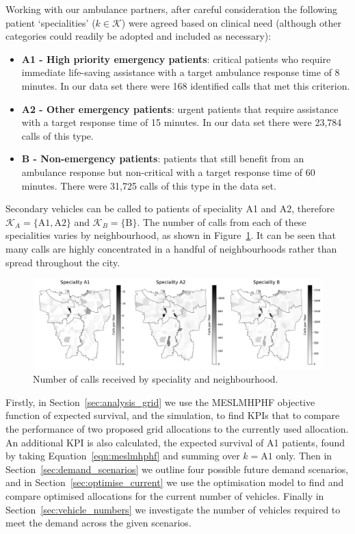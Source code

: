 \documentclass[preprint,12pt]{elsarticle}
\begin{document}
Working with our ambulance partners, after careful consideration the following
patient `specialities' ($k \in \mathcal{K}$) were agreed based on clinical need
(although other categories could readily be adopted and included as necessary):

\begin{itemize}
  \item \textbf{A1 - High priority emergency patients}: critical patients who
  require immediate life-saving assistance with a target ambulance response
  time of 8 minutes. In our data set there were 168 identified calls that met
  this criterion.
  \item \textbf{A2 - Other emergency patients}: urgent patients that require
  assistance with a target response time of 15 minutes. In our data set there
  were 23,784 calls of this type.
  \item \textbf{B - Non-emergency patients}: patients that still benefit from
  an ambulance response but non-critical with a target response time of 60
  minutes. There were 31,725 calls of this type in the data set.
\end{itemize}

Secondary vehicles can be called to patients of speciality A1 and A2,
therefore $\mathcal{K}_A = \{\text{A1}, \text{A2}\}$ and
$\mathcal{K}_B = \{\text{B}\}$.
The number of calls from each of these specialities varies by neighbourhood,
as shown in Figure~\ref{fig:yearly_demand}. It can be seen that many calls are
highly concentrated in a handful of neighbourhoods rather than spread
throughout the city.

\begin{figure}
\begin{center}
\includegraphics[width=\textwidth]{img/yearly_demand.pdf}
\end{center}
\caption{Number of calls received by speciality and neighbourhood.}
\label{fig:yearly_demand}
\end{figure}


Firstly, in Section~\ref{sec:analysis_grid} we use the MESLMHPHF objective
function of expected survival, and the simulation, to find KPIs that to compare
the performance of two proposed grid allocations to the currently used
allocation. An additional KPI is also calculated, the expected survival of A1
patients, found by taking Equation~\ref{eqn:meslmhphf} and summing over
$k = \text{A1}$ only.
Then in Section~\ref{sec:demand_scenarios} we outline four possible
future demand scenarios, and in Section~\ref{sec:optimise_current} we use the
optimisation model to find and compare optimised allocations for the current
number of vehicles. Finally in Section~\ref{sec:vehicle_numbers} we investigate
the number of vehicles required to meet the demand across the given scenarios.
\end{document}
